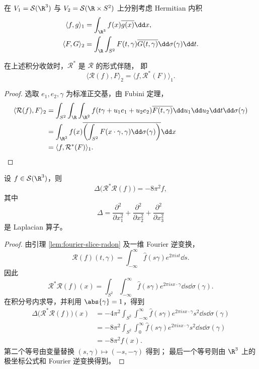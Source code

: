 在 $V_1=\mathcal S(\R^3)$ 与
$V_2=\mathcal S(\R\times S^2)$ 上分别考虑 Hermitian 内积
\[
\begin{aligned}
\langle f,g\rangle_1
&=\int_{\R^3}f(x)\overline{g(x)}\dd x,\\
\langle F,G\rangle_2
&=\int_{\R}\int_{S^2}
F(t,\gamma)\overline{G(t,\gamma)}
\dd\sigma(\gamma)\dd t.
\end{aligned}
\]
\begin{proposition}
	在上述积分收敛时，$\mathcal R^*$ 是 $\mathcal R$ 的形式伴随，
即
\[
\langle\mathcal R(f),F\rangle_2
=\langle f,\mathcal R^*(F)\rangle_1.
\]
\end{proposition}
\begin{proof}
	选取 $e_1,e_2,\gamma$ 为标准正交基，由 Fubini 定理，
	\[
	\begin{aligned}
	\langle\mathcal R(f),F\rangle_2
	&=\int_{S^2}\int_{\R}\int_{\R^2}
	f(t\gamma+u_1e_1+u_2e_2)\overline{F(t,\gamma)}
	\dd u_1\dd u_2\dd t\dd\sigma(\gamma)\\
	&=\int_{\R^3}f(x)
	\overline{\left(\int_{S^2}F(x\cdot\gamma,\gamma)
	\dd\sigma(\gamma)\right)}\dd x\\
&=\langle f,\mathcal R^*(F)\rangle_1.
\end{aligned}
\]
\end{proof}

\begin{theorem}\label{thm:radon-inversion-r3}
	设 $f\in\mathcal S(\R^3)$，则
	\[
	\Delta\bigl(\mathcal R^*\mathcal R(f)\bigr)
	=-8\pi^2f,
	\]
	其中
	\[
	\Delta
	=\frac{\partial^2}{\partial x_1^2}
	+\frac{\partial^2}{\partial x_2^2}
	+\frac{\partial^2}{\partial x_3^2}
	\]
	是 Laplacian 算子。
\end{theorem}

\begin{proof}
	由引理 \ref{lem:fourier-slice-radon} 及一维 Fourier 逆变换，
	\[
	\mathcal R(f)(t,\gamma)
	=\int_{-\infty}^{\infty}
	\widehat f(s\gamma)e^{2\pi ist}\dd s.
	\]
	因此
	\[
	\mathcal R^*\mathcal R(f)(x)
	=\int_{S^2}\int_{-\infty}^{\infty}
	\widehat f(s\gamma)e^{2\pi isx\cdot\gamma}
	\dd s\dd\sigma(\gamma).
	\]
	在积分号内求导，并利用 $\abs{\gamma}=1$，得到
	\[
	\begin{aligned}
	\Delta\bigl(\mathcal R^*\mathcal R(f)\bigr)(x)
	&=-4\pi^2\int_{S^2}\int_{-\infty}^{\infty}
	\widehat f(s\gamma)e^{2\pi isx\cdot\gamma}s^2
	\dd s\dd\sigma(\gamma)\\
	&=-8\pi^2\int_{S^2}\int_0^\infty
	\widehat f(s\gamma)e^{2\pi isx\cdot\gamma}s^2
	\dd s\dd\sigma(\gamma)\\
	&=-8\pi^2f(x).
	\end{aligned}
	\]
	第二个等号由变量替换 $(s,\gamma)\mapsto(-s,-\gamma)$ 得到；
	最后一个等号则由 $\R^3$ 上的极坐标公式和 Fourier 逆变换得到。
\end{proof}

